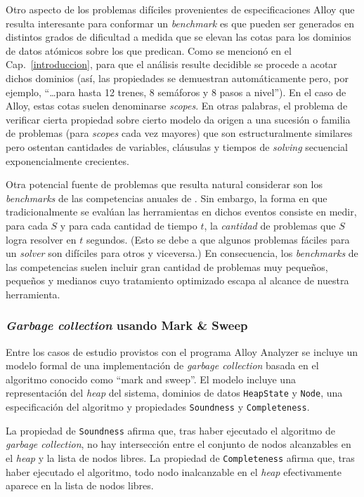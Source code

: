 Otro aspecto de los problemas difíciles provenientes de especificaciones Alloy que resulta interesante para conformar un \emph{benchmark} es que pueden ser generados en distintos grados de dificultad a medida que se elevan las cotas para los dominios de datos atómicos sobre los que predican. Como se mencionó en el Cap.~\ref{introduccion}, para que el análisis resulte decidible se procede a acotar dichos dominios (así, las propiedades se demuestran automáticamente pero, por ejemplo, ``\ldots para hasta 12 trenes, 8 semáforos y 8 pasos a nivel''). En el caso de Alloy, estas cotas suelen denominarse \emph{scopes}. En otras palabras, el problema de verificar cierta propiedad sobre cierto modelo da origen a una sucesión o familia de problemas (para \emph{scopes} cada vez mayores) que son estructuralmente similares pero ostentan cantidades de variables, cláusulas y tiempos de \emph{solving} secuencial exponencialmente crecientes.

Otra potencial fuente de problemas que resulta natural considerar son los \emph{benchmarks} de las competencias anuales de \ssolving. Sin embargo, la forma en que tradicionalmente se evalúan las herramientas en dichos eventos consiste en medir, para cada \ssolver $S$ y para cada cantidad de tiempo $t$, la \emph{cantidad} de problemas que $S$ logra resolver en $t$ segundos. (Esto se debe a que algunos problemas fáciles para un \emph{solver} son difíciles para otros y viceversa.) En consecuencia, los \emph{benchmarks} de las competencias suelen incluir gran cantidad de problemas muy pequeños, pequeños y medianos cuyo tratamiento optimizado escapa al alcance de nuestra herramienta.


\subsubsection{\emph{Garbage collection} usando Mark \& Sweep}

Entre los casos de estudio provistos con el programa Alloy Analyzer se incluye un modelo formal de una implementación de \emph{garbage collection} basada en el algoritmo conocido como ``mark and sweep''. El modelo incluye una representación del \emph{heap} del sistema, dominios de datos \texttt{HeapState} y \texttt{Node}, una especificación del algoritmo y propiedades \texttt{Soundness} y \texttt{Completeness}.

La propiedad de \texttt{Soundness} afirma que, tras haber ejecutado el algoritmo de \emph{garbage collection}, no hay intersección entre el conjunto de nodos alcanzables en el \emph{heap} y la lista de nodos libres. La propiedad de \texttt{Completeness} afirma que, tras haber ejecutado el algoritmo, todo nodo inalcanzable en el \emph{heap} efectivamente aparece en la lista de nodos libres.

